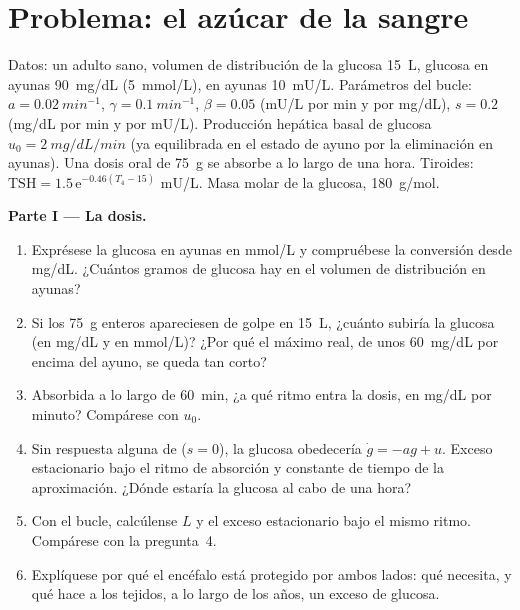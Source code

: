 \section{Problema: el azúcar de la sangre}

\begin{problem}
\label{pb:b3:endocrinology:1}
Datos: un adulto sano, volumen de distribución de la glucosa
\qty{15}{L}, glucosa en ayunas \qty{90}{mg/dL} (\qty{5}{mmol/L}),
 en ayunas \qty{10}{mU/L}. Parámetros del bucle:
$a = \qty{0.02}{min^{-1}}$, $\gamma =
\qty{0.1}{min^{-1}}$, $\beta = 0.05$ (mU/L por min y por mg/dL),
$s = 0.2$ (mg/dL por min y por mU/L). Producción hepática basal de
glucosa $u_{0} =
\qty{2}{mg/dL/min}$ (ya equilibrada en el estado de ayuno por la
eliminación en ayunas). Una dosis oral de \qty{75}{g} se absorbe a lo
largo de una hora. Tiroides:
$\text{TSH} = 1.5\,\mathrm{e}^{-0.46(T_{4} - 15)}$ mU/L. Masa molar de
la glucosa, \qty{180}{g/mol}.

\medskip
\noindent\textbf{Parte I --- La dosis.}
\begin{enumerate}
  \item Exprésese la glucosa en ayunas en mmol/L y compruébese la
        conversión desde mg/dL. ¿Cuántos gramos de glucosa hay en el
        volumen de distribución en ayunas?
  \item Si los \qty{75}{g} enteros apareciesen de golpe en \qty{15}{L},
        ¿cuánto subiría la glucosa (en mg/dL y en mmol/L)? ¿Por qué el
        máximo real, de unos \qty{60}{mg/dL} por encima del ayuno, se
        queda tan corto?
  \item Absorbida a lo largo de \qty{60}{min}, ¿a qué ritmo entra la
        dosis, en mg/dL por minuto? Compárese con $u_{0}$.
  \item Sin respuesta alguna de  ($s = 0$), la glucosa
        obedecería $\dot
        g = -a g + u$. Exceso estacionario bajo el ritmo de absorción y
        constante de tiempo de la aproximación. ¿Dónde estaría la
        glucosa al cabo de una hora?
  \item Con el bucle, calcúlense $L$ y el exceso estacionario bajo el
        mismo ritmo. Compárese con la pregunta~4.
  \item Explíquese por qué el encéfalo está protegido por ambos lados:
        qué necesita, y qué hace a los tejidos, a lo largo de los años,
        un exceso de glucosa.
\end{enumerate}


\end{problem}
